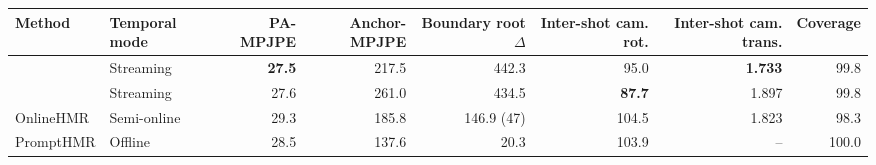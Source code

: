 \begin{tabular}{llrrrrrr}
\toprule
Method & Temporal mode & PA-MPJPE & Anchor-MPJPE & Boundary root $\Delta$ & Inter-shot cam. rot. & Inter-shot cam. trans. & Coverage \\
\midrule
\humanthree{} & Streaming & \textbf{27.5} & 217.5 & 442.3 & 95.0 & \textbf{1.733} & 99.8 \\
\method{} & Streaming & 27.6 & 261.0 & 434.5 & \textbf{87.7} & 1.897 & 99.8 \\
OnlineHMR & Semi-online & 29.3 & 185.8 & 146.9 (47) & 104.5 & 1.823 & 98.3 \\
PromptHMR & Offline & 28.5 & 137.6 & 20.3 & 103.9 & -- & 100.0 \\
\bottomrule
\end{tabular}
